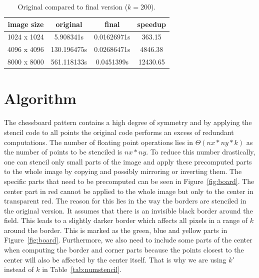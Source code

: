 \documentclass[letterpaper,twocolumn,10pt]{article}
\begin{document}
\begin{table}[ht]
	\vspace{-0.2in}
	\caption{Original compared to final version ($k=200$).}
	\begin{tabular}{c c c c}
		 image size & original & final & speedup \\
		 \hline
		1024 x 1024 & 5.908341s   & 0.01626971s & 363.15\\
		4096 x 4096 & 130.196475s & 0.02686471s & 4846.38\\
		8000 x 8000 & 561.118133s & 0.0451399s & 12430.65\\
	\end{tabular}
	\label{tab:final}
	\vspace{-0.3in}
\end{table}

\section*{Algorithm}
The chessboard pattern contains a high degree of symmetry and by applying the stencil code
to all points the original code performs an excess of redundant computations.
The number of floating point operations lies in $\Theta(nx * ny * k)$
as the number of points to be stenciled is $nx * ny$.
To reduce this number drastically, one can stencil only small parts of the image and apply
these precomputed parts to the whole image by copying and possibly mirroring or inverting them.
The specific parts that need to be precomputed can be seen
in Figure~\ref{fig:board}. The center part in red cannot
be applied to the whole image but only to the center in transparent red.
The reason for this lies in the way the borders are stenciled in the original version. It assumes
that there is an invisible black border around the field. This leads to a slightly darker border
which affects all pixels in a range of $k$ around the border. This is marked as the
green, blue and yellow parts in Figure~\ref{fig:board}. Furthermore, we also need to include some parts of the center when computing the border and corner parts because the points closest to the center will also be affected by the center itself. That is why we are using $k'$ instead of $k$ in Table~\ref{tab:numstencil}.
\end{document}
